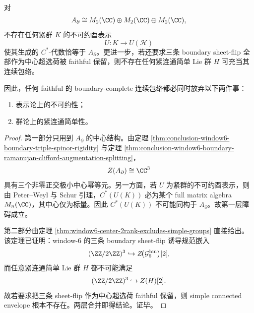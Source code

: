 \begin{theorem}\label{thm:conclusion-window6-boundary-double-irreducibility-obstruction}
对
\[
A_{\partial}\cong M_2(\CC)\oplus M_2(\CC)\oplus M_2(\CC),
\]
不存在任何紧群 \(K\) 的不可约酉表示
\[
U:K\to U(\mathcal H)
\]
使其生成的 \(C^\ast\)-代数恰等于 \(A_{\partial}\)。更进一步，若还要求三条 boundary sheet-flip 全部作为中心超选荷被 faithful 保留，则不存在任何紧连通简单 Lie 群 \(H\) 可充当其连续包络。

因此，任何 faithful 的 boundary-complete 连续包络都必同时放弃以下两件事：
\begin{enumerate}
  \item 表示论上的不可约性；
  \item 群论上的紧连通简单性。
\end{enumerate}
\end{theorem}
\begin{proof}
第一部分只用到 \(A_{\partial}\) 的中心结构。由定理 \ref{thm:conclusion-window6-boundary-triple-spinor-rigidity} 与定理 \ref{thm:conclusion-window6-boundary-ramanujan-clifford-augmentation-splitting}，
\[
Z(A_{\partial})\cong \CC^3
\]
具有三个非零正交极小中心幂等元。另一方面，若 \(U\) 为紧群的不可约酉表示，则由 Peter--Weyl 与 Schur 引理，\(C^\ast(U(K))\) 必为某个 full matrix algebra \(M_n(\CC)\)，其中心仅为标量。因此 \(C^\ast(U(K))\) 不可能同构于 \(A_{\partial}\)。故第一层障碍成立。

第二部分由定理 \ref{thm:window6-center-2rank-excludes-simple-groups} 直接给出。该定理已证明：window-\(6\) 的三条 boundary sheet-flip 诱导规范嵌入
\[
(\ZZ/2\ZZ)^3\hookrightarrow Z\!\bigl(\mathcal G_6^{\mathrm{bin}}\bigr)[2],
\]
而任意紧连通简单 Lie 群 \(H\) 都不可能满足
\[
(\ZZ/2\ZZ)^3\hookrightarrow Z(H)[2].
\]
故若要求把三条 sheet-flip 作为中心超选荷 faithful 保留，则 simple connected envelope 根本不存在。两层合并即得结论。证毕。
\end{proof}

